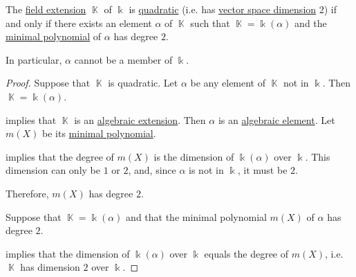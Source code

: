 \begin{lemma}\label{thm:quadratic_extension_minimal_polynomial}
  The \hyperref[def:field/submodel]{field extension} \( \BbbK \) of \( \Bbbk \) is \hyperref[def:field_extension_degree]{quadratic} (i.e. has \hyperref[def:vector_space_dimension]{vector space dimension} \( 2 \)) if and only if there exists an element \( \alpha \) of \( \BbbK \) such that \( \BbbK = \Bbbk(\alpha) \) and the \hyperref[def:algebraic_element_minimal_polynomial]{minimal polynomial} of \( \alpha \) has degree \( 2 \).
\end{lemma}
\begin{comments}
  \item In particular, \( \alpha \) cannot be a member of \( \Bbbk \).
\end{comments}
\begin{proof}
  \SufficiencySubProof Suppose that \( \BbbK \) is quadratic. Let \( \alpha \) be any element of \( \BbbK \) not in \( \Bbbk \). Then \( \BbbK = \Bbbk(\alpha) \).

   implies that \( \BbbK \) is an \hyperref[def:algebraic_extension]{algebraic extension}. Then \( \alpha \) is an \hyperref[def:algebraic_element]{algebraic element}. Let \( m(X) \) be its \hyperref[def:algebraic_element_minimal_polynomial]{minimal polynomial}.

   implies that the degree of \( m(X) \) is the dimension of \( \Bbbk(\alpha) \) over \( \Bbbk \). This dimension can only be \( 1 \) or \( 2 \), and, since \( \alpha \) is not in \( \Bbbk \), it must be \( 2 \).

  Therefore, \( m(X) \) has degree \( 2 \).

  \NecessitySubProof Suppose that \( \BbbK = \Bbbk(\alpha) \) and that the minimal polynomial \( m(X) \) of \( \alpha \) has degree \( 2 \).

   implies that the dimension of \( \Bbbk(\alpha) \) over \( \Bbbk \) equals the degree of \( m(X) \), i.e. \( \BbbK \) has dimension \( 2 \) over \( \Bbbk \).
\end{proof}

